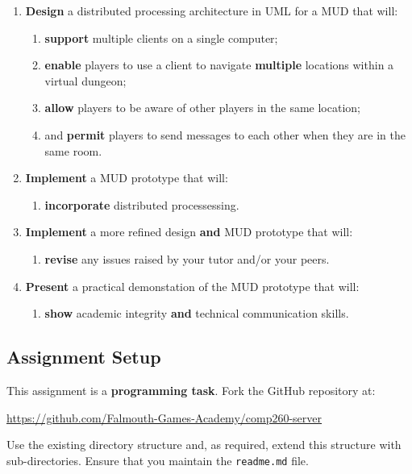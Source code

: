 \documentclass{../../fal_assignment}
\begin{document}
\begin{enumerate}[label=(\Alph*)]
    \item \textbf{Design} a distributed processing architecture in UML for a MUD that will:
    	\begin{enumerate}[label=\roman*.]
    		\item \textbf{support} multiple clients on a single computer;
    		\item \textbf{enable} players to use a client to navigate \textbf{multiple} locations within a virtual dungeon;
    		\item \textbf{allow} players to be aware of other players in the same location;
    		\item and \textbf{permit} players to send messages to each other when they are in the same room.
	\end{enumerate}
    \item \textbf{Implement} a MUD prototype that will:
    	\begin{enumerate}[label=\roman*.]
    		\item \textbf{incorporate} distributed processessing.
	\end{enumerate}
    \item \textbf{Implement} a more refined design \textbf{and} MUD prototype that will:
    	\begin{enumerate}[label=\roman*.]
    		\item \textbf{revise} any issues raised by your tutor and/or your peers.
	\end{enumerate}
    \item \textbf{Present} a practical demonstation of the MUD prototype that will:
    	\begin{enumerate}[label=\roman*.]
    		\item \textbf{show} academic integrity \textbf{and} technical communication skills.
	\end{enumerate}
\end{enumerate}

\subsection*{Assignment Setup}

This assignment is a \textbf{programming task}. Fork the GitHub repository at:

\indent \url{https://github.com/Falmouth-Games-Academy/comp260-server}

Use the existing directory structure and, as required, extend this structure with sub-directories. Ensure that you maintain the \texttt{readme.md} file.
\end{document}
